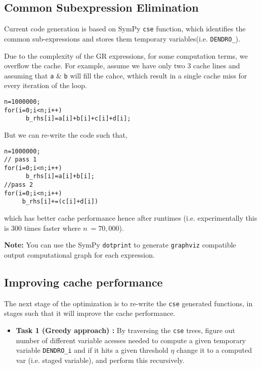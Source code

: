\subsection{Common Subexpression Elimination}

Current code generation is based on SymPy \texttt{cse} function, which identifies the common sub-expressions and stores them temporary variables(i.e. \texttt{DENDRO\_}). 

Due to the complexity of the GR expressions, for some computation terms, we overflow the cache. For example, assume we have only two 3 cache lines and assuming that \texttt{a} \& \texttt{b} will fill the cahce, wthich result in a single cache miss for every iteration of the loop. 
\begin{lstlisting}[style=CStyle]
n=1000000;
for(i=0;i<n;i++)
      b_rhs[i]=a[i]+b[i]+c[i]+d[i];
\end{lstlisting}

But we can re-write the code such that, 
\begin{lstlisting}[style=CStyle]
n=1000000;
// pass 1
for(i=0;i<n;i++)
      b_rhs[i]=a[i]+b[i];
//pass 2
for(i=0;i<n;i++)
     b_rhs[i]+=(c[i]+d[i])
\end{lstlisting}

which has better cache performance hence after runtimes (i.e. experimentally this is 300 times faster where $n~=70,000$). 

\textbf{Note:} You can use the SymPy \texttt{dotprint} to generate \texttt{graphviz} compatible output computational graph for each expression. 

\subsection{Improving cache performance}

The next stage of the optimization is to re-write the \texttt{cse} generated functions, in stages such that it will improve the cache performance. 

\begin{itemize}
\item \textbf{Task 1 (Greedy approach) :}  By traversing the \texttt{cse} trees, figure out number of different variable acesses needed to compute a given temporary variable \texttt{DENDRO\_i} and if it hits a given threshold $\eta$ change it to a computed var (i.e. staged variable), and perform this recursively. 
\end{itemize}


